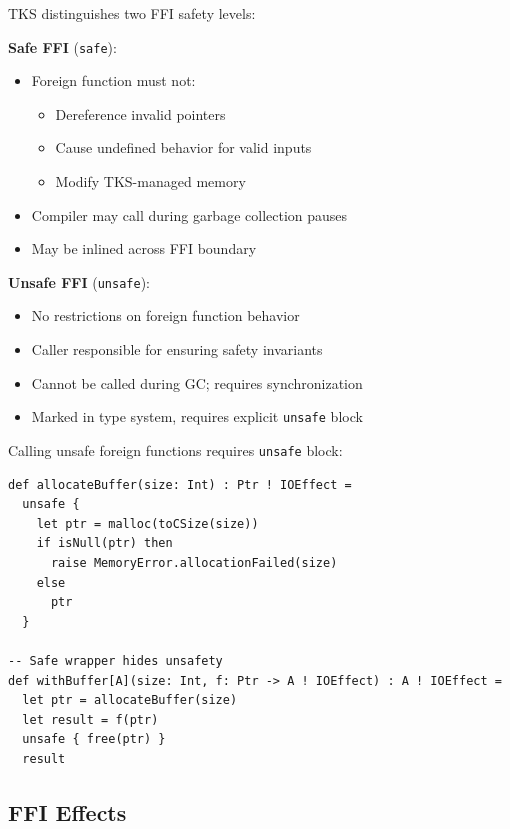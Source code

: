 \begin{definition}
\label{def:ffi-safety-levels}
TKS distinguishes two FFI safety levels:

\textbf{Safe FFI} (\texttt{safe}):
\begin{itemize}
  \item Foreign function must not:
    \begin{itemize}
      \item Dereference invalid pointers
      \item Cause undefined behavior for valid inputs
      \item Modify TKS-managed memory
    \end{itemize}
  \item Compiler may call during garbage collection pauses
  \item May be inlined across FFI boundary
\end{itemize}

\textbf{Unsafe FFI} (\texttt{unsafe}):
\begin{itemize}
  \item No restrictions on foreign function behavior
  \item Caller responsible for ensuring safety invariants
  \item Cannot be called during GC; requires synchronization
  \item Marked in type system, requires explicit \texttt{unsafe} block
\end{itemize}
\end{definition}

\begin{definition}
\label{def:unsafe-blocks}
Calling unsafe foreign functions requires \texttt{unsafe} block:
\begin{verbatim}
def allocateBuffer(size: Int) : Ptr ! IOEffect =
  unsafe {
    let ptr = malloc(toCSize(size))
    if isNull(ptr) then
      raise MemoryError.allocationFailed(size)
    else
      ptr
  }

-- Safe wrapper hides unsafety
def withBuffer[A](size: Int, f: Ptr -> A ! IOEffect) : A ! IOEffect =
  let ptr = allocateBuffer(size)
  let result = f(ptr)
  unsafe { free(ptr) }
  result
\end{verbatim}
\end{definition}

\subsection{FFI Effects}
\label{subsec:ffi-effects}

